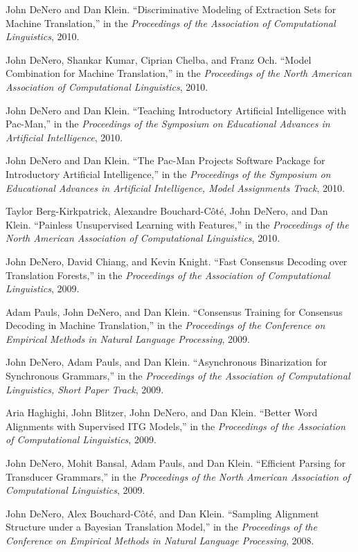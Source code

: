 \documentclass[margin,line]{res}
\begin{document}
\begin{resume}
John DeNero and Dan Klein. ``Discriminative Modeling of Extraction Sets for Machine Translation,'' in the {\it Proceedings of the Association of Computational Linguistics}, 2010.

John DeNero, Shankar Kumar, Ciprian Chelba, and Franz Och. ``Model Combination for Machine Translation,'' in the {\it Proceedings of the North American Association of Computational Linguistics}, 2010.

John DeNero and Dan Klein. ``Teaching Introductory Artificial Intelligence with Pac-Man,'' in the {\it Proceedings of the Symposium on Educational Advances in Artificial Intelligence}, 2010.

John DeNero and Dan Klein. ``The Pac-Man Projects Software Package for Introductory Artificial Intelligence,'' in the {\it Proceedings of the Symposium on Educational Advances in Artificial Intelligence, Model Assignments Track}, 2010.

Taylor Berg-Kirkpatrick, Alexandre Bouchard-Côté, John DeNero, and Dan Klein. ``Painless Unsupervised Learning with Features,'' in the {\it Proceedings of the North American Association of Computational Linguistics}, 2010.

John DeNero, David Chiang, and Kevin Knight. ``Fast Consensus Decoding over Translation Forests,'' in the {\it Proceedings of the Association of Computational Linguistics}, 2009.

Adam Pauls, John DeNero, and Dan Klein. ``Consensus Training for Consensus Decoding in Machine Translation,'' in the {\it Proceedings of the Conference on Empirical Methods in Natural Language Processing}, 2009.

John DeNero, Adam Pauls, and Dan Klein. ``Asynchronous Binarization for Synchronous Grammars,'' in the {\it Proceedings of the Association of Computational Linguistics, Short Paper Track}, 2009.

Aria Haghighi, John Blitzer, John DeNero, and Dan Klein. ``Better Word Alignments with Supervised ITG Models,'' in the {\it Proceedings of the Association of Computational Linguistics}, 2009.

John DeNero, Mohit Bansal, Adam Pauls, and Dan Klein. ``Efficient Parsing for Transducer Grammars,'' in the {\it Proceedings of the North American Association of Computational Linguistics}, 2009.

John DeNero, Alex Bouchard-Côté, and Dan Klein. ``Sampling Alignment Structure under a Bayesian Translation Model,'' in the {\it Proceedings of the Conference on Empirical Methods in Natural Language Processing}, 2008.


\end{resume}
\end{document}

